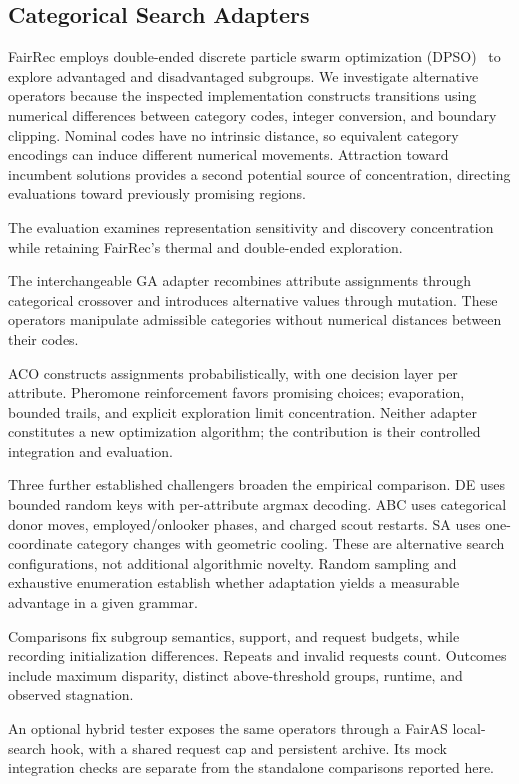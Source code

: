 \subsection{Categorical Search Adapters}
FairRec employs double-ended discrete particle swarm optimization (DPSO)~\cite{guo2023fairrec} to explore advantaged and disadvantaged subgroups. We investigate alternative operators because the inspected implementation constructs transitions using numerical differences between category codes, integer conversion, and boundary clipping. Nominal codes have no intrinsic distance, so equivalent category encodings can induce different numerical movements. Attraction toward incumbent solutions provides a second potential source of concentration, directing evaluations toward previously promising regions.

The evaluation examines representation sensitivity and discovery concentration while retaining FairRec's thermal and double-ended exploration.

The interchangeable GA adapter recombines attribute assignments through categorical crossover and introduces alternative values through mutation. These operators manipulate admissible categories without numerical distances between their codes.

ACO constructs assignments probabilistically, with one decision layer per attribute. Pheromone reinforcement favors promising choices; evaporation, bounded trails, and explicit exploration limit concentration. Neither adapter constitutes a new optimization algorithm; the contribution is their controlled integration and evaluation.

Three further established challengers broaden the empirical comparison. DE uses bounded random keys with per-attribute argmax decoding. ABC uses categorical donor moves, employed/onlooker phases, and charged scout restarts. SA uses one-coordinate category changes with geometric cooling. These are alternative search configurations, not additional algorithmic novelty. Random sampling and exhaustive enumeration establish whether adaptation yields a measurable advantage in a given grammar.

Comparisons fix subgroup semantics, support, and request budgets, while recording initialization differences. Repeats and invalid requests count. Outcomes include maximum disparity, distinct above-threshold groups, runtime, and observed stagnation.

An optional hybrid tester exposes the same operators through a FairAS local-search hook, with a shared request cap and persistent archive. Its mock integration checks are separate from the standalone comparisons reported here.

